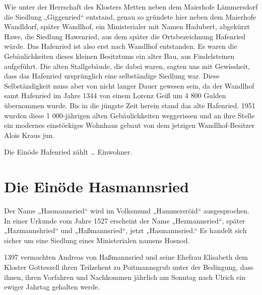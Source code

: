 \documentclass[12pt,a4pager]{book}
\begin{document}
Wie unter der Herrschaft des Klosters Metten neben dem Maierhofe Lämmersdorf die
Siedlung „Giggenried“ entstand, genau so gründete hier neben dem Maierhofe
Wandldorf, später Wandlhof, ein Ministerialer mit Namen Hadubert, abgekürzt
Hawe, die Siedlung Hawenried, aus dem später die Ortsbezeichnung Hafenried
würde. Das Hafenried ist also erst nach Wandlhof entstanden. Es waren die
Gebäulichkeiten dieses kleinen Besitztums ein alter Bau, aus Findelsteinen
aufgeführt. Die alten Stallgebäude, die dabei waren, sagten uns mit Gewissheit,
dass das Hafenried ursprünglich eine selbständige Siedlung war. Diese
Selbständigkeit muss aber von nicht langer Dauer gewesen sein, da der Wandlhof
samt Hafenried im Jahre 1344 von einem Lorenz Geiß um 4 800 Gulden übernommen
wurde. Bis in die jüngste Zeit herein stand das alte Hafenried. 1951 wurden
diese 1 000-jährigen alten Gebäulichkeiten weggerissen und an ihre Stelle ein
modernes einstöckiges Wohnhaus gebaut von dem jetzigen Wandlhof-Besitzer Alois
Kraus jun.

Die Einöde Hafenried zählt … Einwohner.

\section{Die Einöde Hasmannsried}

Der Name „Hasmannsried“ wird im Volksmund „Hammersröid“ ausgesprochen. In einer
Urkunde vom Jahre 1527 erscheint der Name „Hezmannsried“, später „Hazmannshried“
und „Haßmannsried“, jetzt „Hasmannsried.“ Es handelt sich sicher um eine
Siedlung eines Ministerialen namens Hosnod.

1397 vermachten Andreas von Haßmannsried und seine Ehefrau Elisabeth dem Kloster
Gotteszell ihren Teilzehent zu Poitmannsgrub unter der Bedingung, dass ihnen,
ihren Vorfahren und Nachkommen jährlich am Sonntag nach Ulrich ein ewiger
Jahrtag gehalten werde.
\end{document}
